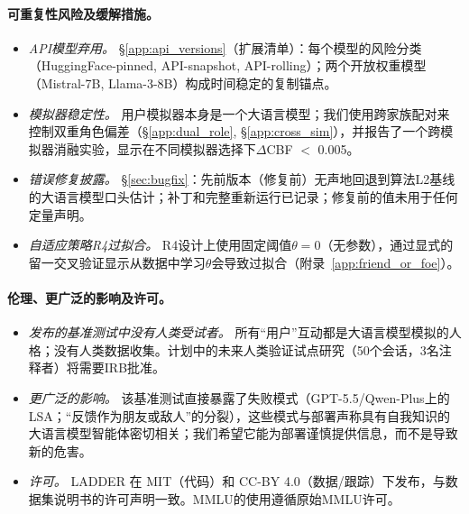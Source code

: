 \documentclass[11pt,a4paper,fontset=fandol]{ctexart}
\begin{document}
\paragraph{可重复性风险及缓解措施。}
\begin{itemize}[nosep,leftmargin=1.4em]
  \item \emph{API模型弃用。} \S\ref{app:api_versions}（扩展清单）：每个模型的风险分类（HuggingFace-pinned, API-snapshot, API-rolling）；两个开放权重模型（Mistral-7B, Llama-3-8B）构成时间稳定的复制锚点。
  \item \emph{模拟器稳定性。} 用户模拟器本身是一个大语言模型；我们使用跨家族配对来控制双重角色偏差（\S\ref{app:dual_role}, \S\ref{app:cross_sim}），并报告了一个跨模拟器消融实验，显示在不同模拟器选择下$\Delta$CBF $<$ 0.005。
  \item \emph{错误修复披露。} \checkmark{} \S\ref{sec:bugfix}：先前版本（修复前）无声地回退到算法L2基线的大语言模型口头估计；补丁和完整重新运行已记录；修复前的值未用于任何定量声明。
  \item \emph{自适应策略R4过拟合。} \checkmark{} R4设计上使用固定阈值$\theta=0$（无参数），通过显式的留一交叉验证显示从数据中学习$\theta$会导致过拟合（附录~\ref{app:friend_or_foe}）。
\end{itemize}

\paragraph{伦理、更广泛的影响及许可。}
\begin{itemize}[nosep,leftmargin=1.4em]
  \item \emph{发布的基准测试中没有人类受试者。} 所有“用户”互动都是大语言模型模拟的人格；没有人类数据收集。计划中的未来人类验证试点研究（50个会话，3名注释者）将需要IRB批准。
  \item \emph{更广泛的影响。} 该基准测试直接暴露了失败模式（GPT-5.5/Qwen-Plus上的LSA；“反馈作为朋友或敌人”的分裂），这些模式与部署声称具有自我知识的大语言模型智能体密切相关；我们希望它能为部署谨慎提供信息，而不是导致新的危害。
  \item \emph{许可。} LADDER 在 MIT（代码）和 CC-BY 4.0（数据/跟踪）下发布，与数据集说明书的许可声明一致。MMLU的使用遵循原始MMLU许可。
\end{itemize}



\end{document}
